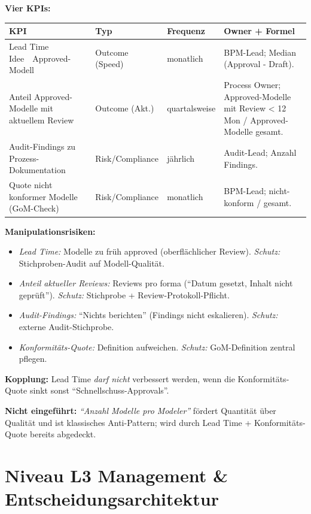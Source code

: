 \documentclass[11pt,a4paper,oneside]{article}
\begin{document}
\begin{loesungbox}
\textbf{Vier KPIs:}

\begin{tabularx}{\linewidth}{@{}p{3.6cm}llX@{}}
\toprule
\textbf{KPI} & \textbf{Typ} & \textbf{Frequenz} & \textbf{Owner + Formel} \\
\midrule
Lead Time Idee~\textrightarrow{}~Approved-Modell & Outcome (Speed) & monatlich & BPM-Lead; Median (Approval - Draft). \\
Anteil Approved-Modelle mit aktuellem Review & Outcome (Akt.) & quartalsweise & Process Owner; Approved-Modelle mit Review < 12\,Mon / Approved-Modelle gesamt. \\
Audit-Findings zu Prozess-Dokumentation & Risk/Compliance & j\"ahrlich & Audit-Lead; Anzahl Findings. \\
Quote nicht konformer Modelle (GoM-Check) & Risk/Compliance & monatlich & BPM-Lead; nicht-konform / gesamt. \\
\bottomrule
\end{tabularx}

\smallskip
\textbf{Manipulationsrisiken:}
\begin{itemize}
  \item \emph{Lead Time:} Modelle zu fr\"uh approved (oberfl\"achlicher Review). \emph{Schutz:} Stichproben-Audit auf Modell-Qualit\"at.
  \item \emph{Anteil aktueller Reviews:} Reviews pro forma (``Datum gesetzt, Inhalt nicht gepr\"uft''). \emph{Schutz:} Stichprobe + Review-Protokoll-Pflicht.
  \item \emph{Audit-Findings:} ``Nichts berichten'' (Findings nicht eskalieren). \emph{Schutz:} externe Audit-Stichprobe.
  \item \emph{Konformit\"ats-Quote:} Definition aufweichen. \emph{Schutz:} GoM-Definition zentral pflegen.
\end{itemize}

\smallskip
\textbf{Kopplung:} Lead Time \emph{darf nicht} verbessert werden, wenn die Konformit\"ats-Quote sinkt \textendash{} sonst ``Schnellschuss-Approvals''.

\smallskip
\textbf{Nicht eingef\"uhrt:} \emph{``Anzahl Modelle pro Modeler''} \textendash{} f\"ordert Quantit\"at \"uber Qualit\"at und ist klassisches Anti-Pattern; wird durch Lead Time + Konformit\"ats-Quote bereits abgedeckt.
\end{loesungbox}

\clearpage

\section*{Niveau L3 \textendash{} Management \& Entscheidungsarchitektur}
\end{document}
